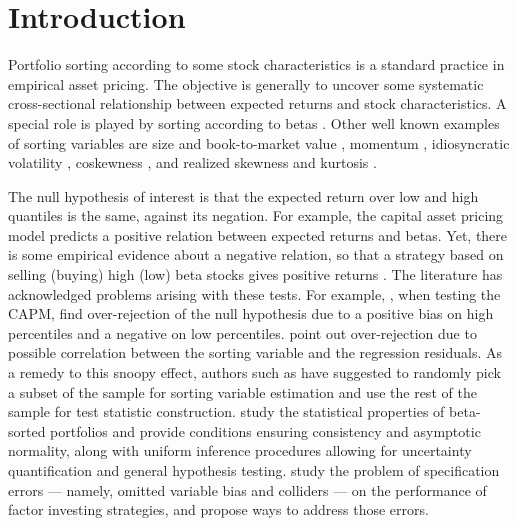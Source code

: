 
\section{Introduction}
\label{Introduction}

Portfolio sorting according to some stock characteristics is a standard practice in empirical asset pricing. The objective is generally to uncover some systematic cross-sectional relationship between expected returns and stock characteristics. A special role is played by sorting according to betas \citep{fama1973risk}. Other well known examples of sorting variables are size and book-to-market value \citep{fama1993common}, momentum \citep{jegadeesh1993returns}, idiosyncratic volatility \citep{ang2006cross}, coskewness \citep{harvey2000conditional}, and realized skewness and kurtosis \citep{amaya2015does}.

The null hypothesis of interest is that the expected return over low and high quantiles is the same, against its negation. For example, the capital asset pricing model \citep{sharpe1964capital, lintner1965valuation} predicts a positive relation between expected returns and betas. Yet, there is some empirical evidence about a negative relation, so that a strategy based on selling (buying) high (low) beta stocks gives positive returns \citep{frazzini2014betting}. The literature has acknowledged problems arising with these tests. For example, \cite{fama1973risk}, when testing the CAPM, find over-rejection of the null hypothesis due to a positive bias on high percentiles and a negative on low percentiles. \cite{lo1988stock} point out over-rejection due to possible correlation between the sorting variable and the regression residuals. As a remedy to this snoopy effect, authors such as \cite{liang2000portfolio} have suggested to randomly pick a subset of the sample for sorting variable estimation and use the rest of the sample for test statistic construction. \cite{cattaneo2022beta} study the statistical properties of beta-sorted portfolios and provide conditions ensuring consistency and asymptotic normality, along with uniform inference procedures allowing for uncertainty quantification and general hypothesis testing. \cite{lopez2024has} study the problem of specification errors --- namely, omitted variable bias and colliders --- on the performance of factor investing strategies, and propose ways to address those errors.

